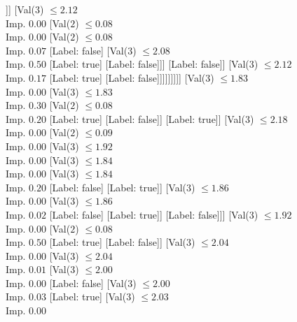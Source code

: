 \documentclass[margin=10pt]{standalone}
\begin{document}
\begin{forest}
													[Val($3$) $ \leq 2.06$ \\ Imp. $0.18$
														[Label: true]
														[Label: false]]]
												[Val($3$) $ \leq 2.12$ \\ Imp. $0.00$
													[Val($2$) $ \leq 0.08$ \\ Imp. $0.00$
														[Val($2$) $ \leq 0.08$ \\ Imp. $0.07$
															[Label: false]
															[Val($3$) $ \leq 2.08$ \\ Imp. $0.50$
																[Label: true]
																[Label: false]]]
														[Label: false]]
													[Val($3$) $ \leq 2.12$ \\ Imp. $0.17$
														[Label: true]
														[Label: false]]]]]]]]]
						[Val($3$) $ \leq 1.83$ \\ Imp. $0.00$
							[Val($3$) $ \leq 1.83$ \\ Imp. $0.30$
								[Val($2$) $ \leq 0.08$ \\ Imp. $0.20$
									[Label: true]
									[Label: false]]
								[Label: true]]
							[Val($3$) $ \leq 2.18$ \\ Imp. $0.00$
								[Val($2$) $ \leq 0.09$ \\ Imp. $0.00$
									[Val($3$) $ \leq 1.92$ \\ Imp. $0.00$
										[Val($3$) $ \leq 1.84$ \\ Imp. $0.00$
											[Val($3$) $ \leq 1.84$ \\ Imp. $0.20$
												[Label: false]
												[Label: true]]
											[Val($3$) $ \leq 1.86$ \\ Imp. $0.00$
												[Val($3$) $ \leq 1.86$ \\ Imp. $0.02$
													[Label: false]
													[Label: true]]
												[Label: false]]]
										[Val($3$) $ \leq 1.92$ \\ Imp. $0.00$
											[Val($2$) $ \leq 0.08$ \\ Imp. $0.50$
												[Label: true]
												[Label: false]]
											[Val($3$) $ \leq 2.04$ \\ Imp. $0.00$
												[Val($3$) $ \leq 2.04$ \\ Imp. $0.01$
													[Val($3$) $ \leq 2.00$ \\ Imp. $0.00$
														[Label: false]
														[Val($3$) $ \leq 2.00$ \\ Imp. $0.03$
															[Label: true]
															[Val($3$) $ \leq 2.03$ \\ Imp. $0.00$

\end{forest}
\end{document}
